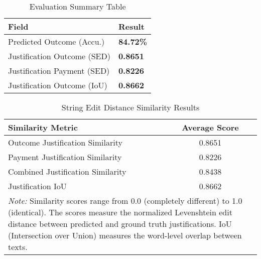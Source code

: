 
\begin{table}[H]
\centering
\caption{Evaluation Summary Table}
\label{tab:evaluation_summary}
\begin{tabular}{@{}lp{2cm}@{}}
\toprule
\textbf{Field} & \textbf{Result} \\
\midrule
Predicted Outcome (Accu.) & \textbf{84.72\%} \\
Justification Outcome (SED) &  \textbf{0.8651} \\
Justification Payment (SED) &  \textbf{0.8226} \\
Justification Outcome (IoU) &  \textbf{0.8662} \\
\bottomrule
\end{tabular}
\end{table}

\begin{table}[H]
\centering
\caption{String Edit Distance Similarity Results}
\label{tab:string_edit_distance_results}
\begin{tabular}{lc}
\toprule
\textbf{Similarity Metric} & \textbf{Average Score} \\
\midrule
Outcome Justification Similarity & 0.8651 \\
Payment Justification Similarity & 0.8226 \\
Combined Justification Similarity & 0.8438 \\
Justification IoU & 0.8662 \\
\midrule
\multicolumn{2}{p{13cm}}{\textit{Note:} Similarity scores range from 0.0 (completely different) to 1.0 (identical). 
The scores measure the normalized Levenshtein edit distance between predicted and ground truth justifications.
IoU (Intersection over Union) measures the word-level overlap between texts.} \\
\bottomrule
\end{tabular}
\end{table}

